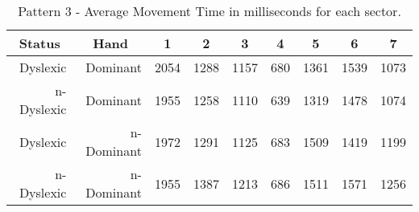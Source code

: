 			\begin{table}[h]
				\centering
				\caption{Pattern 3 - Average Movement Time in milliseconds for each sector.}
				\label{tab_pat_3_mt}
				\begin{tabularx}{\textwidth}{|r|r|X|X|X|X|X|X|X|}
					\hline
					\multicolumn{1}{|c|}{\textbf{Status}} & \multicolumn{1}{c|}{\textbf{Hand}} & \multicolumn{1}{c|}{\textbf{1}} & \multicolumn{1}{c|}{\textbf{2}} & \multicolumn{1}{c|}{\textbf{3}} & \multicolumn{1}{c|}{\textbf{4}} & \multicolumn{1}{c|}{\textbf{5}} & \multicolumn{1}{c|}{\textbf{6}} & \multicolumn{1}{c|}{\textbf{7}} \\ \hline
					Dyslexic                              & Dominant                           & 2054       & 1288       & 1157       & 680        & 1361       & 1539       & 1073       \\ \hline
					n-Dyslexic                          & Dominant                           & 1955       & 1258       & 1110       & 639        & 1319       & 1478       & 1074       \\ \hline
					Dyslexic                              & n-Dominant                            & 1972       & 1291       & 1125       & 683        & 1509       & 1419       & 1199       \\ \hline
					n-Dyslexic                          & n-Dominant                            & 1955       & 1387       & 1213       & 686        & 1511       & 1571       & 1256       \\ \hline
				\end{tabularx}
			\end{table}
			
